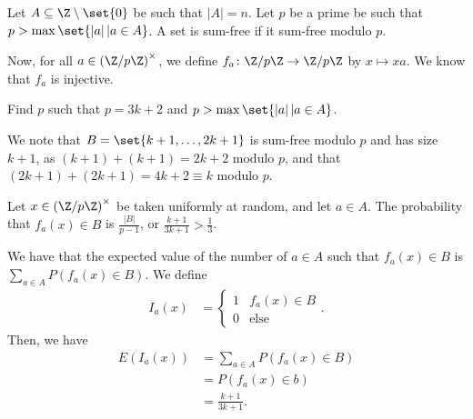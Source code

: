 \documentclass[10pt]{mypackage}
\begin{document}
\begin{solution}
  Let $A\subseteq \Z\setminus \set{0}$ be such that $\left\vert A \right\vert = n$. Let $p$ be a prime be such that $p > \max\set{\left\vert a \right\vert | a\in A}$. A set is sum-free if it sum-free modulo $p$.\newline

  Now, for all $a\in \left( \Z/p\Z \right)^{\times}$, we define $f_a\colon \Z/p\Z\rightarrow \Z/p\Z$ by $x\mapsto xa$. We know that $f_a$ is injective.\newline

  Find $p$ such that $p = 3k + 2$ and $p > \max\set{\left\vert a \right\vert | a\in A}$.\newline

  We note that $B = \set{k+1,\dots,2k+1}$ is sum-free modulo $p$ and has size $k + 1$, as $\left( k+1 \right) + \left( k+1 \right) = 2k + 2$ modulo $p$, and that $\left( 2k+1 \right) + \left( 2k+1 \right) = 4k + 2 \equiv k$ modulo $p$.\newline

  Let $x\in \left( \Z/p\Z \right)^{\times}$ be taken uniformly at random, and let $a\in A$. The probability that $f_a(x) \in B$ is $\frac{\left\vert B \right\vert}{p-1}$, or $\frac{k+1}{3k+1} > \frac{1}{3}$.\newline

  We have that the expected value of the number of $a\in A$ such that $f_a(x)\in B$ is $\sum_{a\in A}P\left( f_a(x)\in B \right)$. We define
  \begin{align*}
    I_a(x) &= \begin{cases}
      1 & f_a(x)\in B\\
      0 & \text{else}
    \end{cases}.
  \end{align*}
  Then, we have
  \begin{align*}
    E\left( I_a(x) \right) &= \sum_{a\in A}P\left( f_a(x)\in B \right)\\
                           &= P\left( f_a(x)\in b \right)\\
                           &= \frac{k+1}{3k+1}.
  \end{align*}
  
\end{solution}
\end{document}
